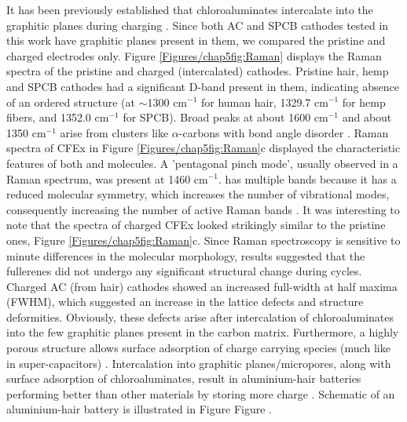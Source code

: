 It has been previously established that chloroaluminates intercalate into the graphitic planes during charging \cite{lin_ultrafast_2015-3}. Since both AC and SPCB cathodes tested in this work have graphitic planes present in them, we compared the pristine and charged electrodes only. Figure \ref{Figures/chap5fig:Raman} displays the Raman spectra of the pristine and charged (intercalated) cathodes. Pristine hair, hemp and SPCB cathodes had a significant D-band present in them, indicating absence of an ordered structure (at $\sim$1300 cm$^{-1}$ for human hair, 1329.7 cm$^{-1}$ for hemp fibers, and 1352.0 cm$^{-1}$ for SPCB). Broad peaks at about 1600 cm$^{-1}$ and about 1350 cm$^{-1}$ arise from  clusters like $\alpha$-carbons with bond angle disorder \cite{shimodaira_raman_2002}. Raman spectra of CFEx in Figure \ref{Figures/chap5fig:Raman}c displayed the characteristic features of both  and  molecules. A 'pentagonal pinch mode', usually observed in a  Raman spectrum, was present at 1460 cm$^{-1}$.  has multiple bands because it has a reduced molecular symmetry, which increases the number of vibrational modes, consequently increasing the number of active Raman bands \cite{kimbrell_analysis_2014}. It was interesting to note that the spectra of charged CFEx looked strikingly similar to the pristine ones, Figure \ref{Figures/chap5fig:Raman}c. Since Raman spectroscopy is sensitive to minute differences in the molecular morphology, results suggested that the fullerenes did not undergo any significant structural change during cycles. Charged AC (from hair) cathodes showed an increased full-width at half maxima (FWHM), which suggested an increase in the lattice defects and structure deformities. Obviously, these defects arise after intercalation of chloroaluminates into the few graphitic planes present in the carbon matrix. Furthermore, a highly porous structure allows surface adsorption of charge carrying species (much like in super-capacitors) \cite{beguin_carbons_2014}. Intercalation into graphitic planes/micropores, along with surface adsorption of chloroaluminates, result in aluminium-hair batteries performing better than other materials by storing more charge \cite{brezesinski_ordered_2010}. Schematic of an aluminium-hair battery is illustrated in Figure Figure .

